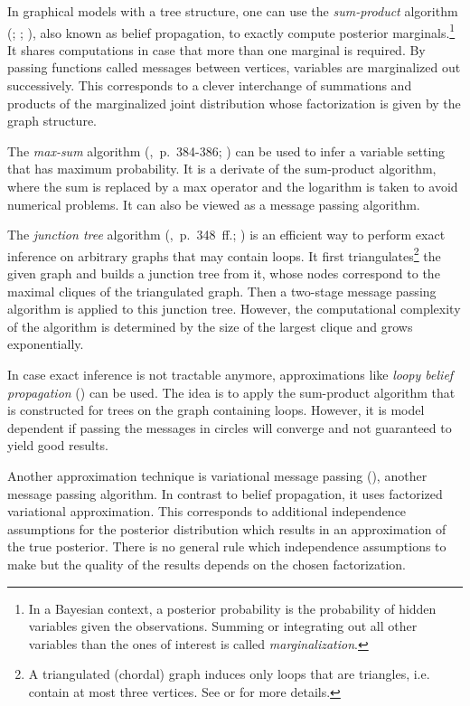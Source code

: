 In graphical models with a tree structure, one can use the \emph{sum-product} algorithm (\cite{pearl1988probabilistic}; \cite{kim1983computational}; \cite{pearl1982reverend}), also known as belief propagation, to exactly compute posterior marginals.\footnote{In a Bayesian context, a posterior probability is the probability of hidden variables given the observations. Summing or integrating out all other variables than the ones of interest is called \emph{marginalization}.} It shares computations in case that more than one marginal is required. By passing functions called messages between vertices, variables are marginalized out successively. This corresponds to a clever interchange of summations and products of the marginalized joint distribution whose factorization is given by the graph structure.

The \emph{max-sum} algorithm (\cite{bishop2006pattern},~p.~384-386; \cite{dawid1992applications}) can be used to infer a variable setting that has maximum probability. It is a derivate of the sum-product algorithm, where the sum is replaced by a max operator and the logarithm is taken to avoid numerical problems. It can also be viewed as a message passing algorithm.

The \emph{junction tree} algorithm (\cite{koller2009probabilistic},~p.~348~ff.; \cite{lauritzen1988local}) is an efficient way to perform exact inference on arbitrary graphs that may contain loops. It first triangulates\footnote{A triangulated (chordal) graph induces only loops that are triangles, i.e. contain at most three vertices.  See \textcite{fulkerson1965incidence} or \textcite{rose1976algorithmic} for more details.} the given graph and builds a junction tree from it, whose nodes correspond to the maximal cliques of the triangulated graph. Then a two-stage message passing algorithm is applied to this junction tree. However, the computational complexity of the algorithm is determined by the size of the largest clique and grows exponentially.

In case exact inference is not tractable anymore, approximations like \emph{loopy belief propagation} (\cite{frey1998revolution}) can be used. The idea is to apply the sum-product algorithm that is constructed for trees on the graph containing loops. However, it is model dependent if passing the messages in circles will converge and not guaranteed to yield good results.

Another approximation technique is variational message passing (\cite{winn2005variational}), another message passing algorithm. In contrast to belief propagation, it uses factorized variational approximation. This corresponds to additional independence assumptions for the posterior distribution which results in an approximation of the true posterior. There is no general rule which independence assumptions to make but the quality of the results depends on the chosen factorization.


